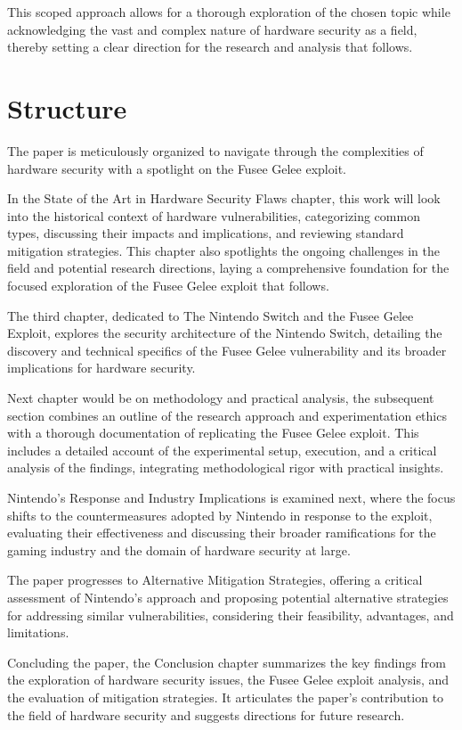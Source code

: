 This scoped approach allows for a thorough exploration of the chosen
topic while acknowledging the vast and complex nature of hardware
security as a field, thereby setting a clear direction for the research
and analysis that follows.

\hypertarget{structure}{%
\section{Structure}\label{structure}}

The paper is meticulously organized to navigate through the
complexities of hardware security with a spotlight on the Fusee Gelee
exploit.

In the State of the Art in Hardware Security Flaws chapter, this work
will look into the historical context of hardware vulnerabilities,
categorizing common types, discussing their impacts and implications,
and reviewing standard mitigation strategies. This chapter also
spotlights the ongoing challenges in the field and potential research
directions, laying a comprehensive foundation for the focused
exploration of the Fusee Gelee exploit that follows.

The third chapter, dedicated to The Nintendo Switch and the Fusee Gelee
Exploit, explores the security architecture of the Nintendo Switch,
detailing the discovery and technical specifics of the Fusee Gelee
vulnerability and its broader implications for hardware security.

Next chapter would be on methodology and practical analysis, the
subsequent section combines an outline of the research approach and
experimentation ethics with a thorough documentation of replicating the
Fusee Gelee exploit. This includes a detailed account of the
experimental setup, execution, and a critical analysis of the findings,
integrating methodological rigor with practical insights.

Nintendo's Response and Industry Implications is examined next, where
the focus shifts to the countermeasures adopted by Nintendo in response
to the exploit, evaluating their effectiveness and discussing their
broader ramifications for the gaming industry and the domain of hardware
security at large.

The paper progresses to Alternative Mitigation Strategies, offering a
critical assessment of Nintendo's approach and proposing potential
alternative strategies for addressing similar vulnerabilities,
considering their feasibility, advantages, and limitations.

Concluding the paper, the Conclusion chapter summarizes the key
findings from the exploration of hardware security issues, the Fusee
Gelee exploit analysis, and the evaluation of mitigation strategies. It
articulates the paper's contribution to the field of hardware security
and suggests directions for future research.
